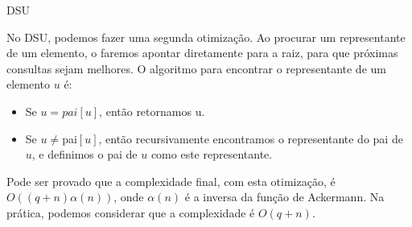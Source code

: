 \begin{frame}{DSU}

    No DSU, podemos fazer uma segunda otimização. Ao procurar um representante de um elemento, o faremos apontar diretamente para a raiz, para que próximas consultas sejam melhores. O algoritmo para encontrar o representante de um elemento $u$ é:

    \begin{itemize}
        \item Se $u = pai[u]$, então retornamos u.
        \item Se $u \not = $pai$[u]$, então recursivamente encontramos o representante do pai de $u$, e definimos o pai de $u$ como este representante.
    \end{itemize}
    
    Pode ser provado que a complexidade final, com esta otimização, é $O((q + n)\alpha(n))$, onde $\alpha(n)$ é a inversa da função de Ackermann. Na prática, podemos considerar que a complexidade é $O(q+n)$.



\end{frame}
